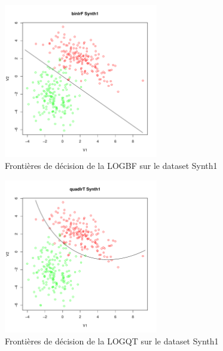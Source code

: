 \documentclass{report}
\begin{document}
\begin{figure}[ht!]
\begin{center}
    \includegraphics[width=0.6\textwidth]{results/binlrf/binlrf-Synth1.pdf}
    \caption{Frontières de décision de la LOGBF sur le dataset Synth1}
\end{center}
\end{figure}

\begin{figure}[ht!]
\begin{center}
    \includegraphics[width=0.6\textwidth]{results/quadlrt/quadlrt-Synth1.pdf}
    \caption{Frontières de décision de la LOGQT sur le dataset Synth1}
\end{center}
\end{figure}
\end{document}
